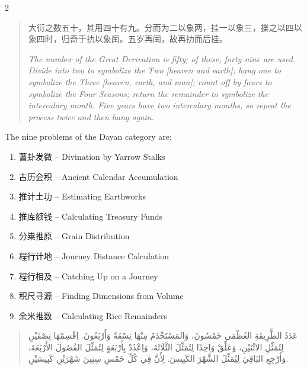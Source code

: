 \documentclass[11pt,a4paper]{article}
\newcommand{\ar}[1]{\arabicfont\beginR #1\endR}
\newcommand{\zhtext}[1]{{\chinese #1}}
\newenvironment{bilingual}{%
  \begin{paracol}{2}
}{%
  \end{paracol}
}
\begin{document}
\vspace{0.5em}

\begin{bilingual}
\begin{leftcolumn*}
\begin{quote}
\zhtext{大衍之数五十，其用四十有九。分而为二以象两，挂一以象三，揲之以四以象四时，归奇于扐以象闰。五岁再闰，故再扐而后挂。}

\textit{The number of the Great Derivation is fifty; of these, forty-nine are used. Divide into two to symbolize the Two [heaven and earth]; hang one to symbolize the Three [heaven, earth, and man]; count off by fours to symbolize the Four Seasons; return the remainder to symbolize the intercalary month. Five years have two intercalary months, so repeat the process twice and then hang again.}
\end{quote}

The nine problems of the Dayan category are:
\begin{enumerate}[label=\arabic*.]
  \item \zhtext{蓍卦发微} -- Divination by Yarrow Stalks
  \item \zhtext{古历会积} -- Ancient Calendar Accumulation
  \item \zhtext{推计土功} -- Estimating Earthworks
  \item \zhtext{推库额钱} -- Calculating Treasury Funds
  \item \zhtext{分粜推原} -- Grain Distribution
  \item \zhtext{程行计地} -- Journey Distance Calculation
  \item \zhtext{程行相及} -- Catching Up on a Journey
  \item \zhtext{积尺寻源} -- Finding Dimensions from Volume
  \item \zhtext{余米推数} -- Calculating Rice Remainders
\end{enumerate}
\end{leftcolumn*}

\begin{rightcolumn*}
\begin{quote}
\ar{عَدَدُ الطَّرِيقَةِ العُظْمَى خَمْسُونَ، وَالمَسْتَخْدَمُ مِنْهَا تِسْعَةٌ وَأَرْبَعُونَ. اِقْسِمْهَا نِصْفَيْنِ لِتُمَثِّلِ الاثْنَيْنِ، وَعَلِّقْ وَاحِدًا لِتُمَثِّلَ الثَّلَاثَةَ، وَاِعْدُدْ بِأَرْبَعَةٍ لِتُمَثِّلَ الفُصُولَ الأَرْبَعَةَ، وَأَرْجِعِ البَاقِيَ لِيُمَثِّلَ الشَّهْرَ الكَبِيسَ. لِأَنَّ فِي كُلِّ خَمْسِ سِنِينَ شَهْرَيْنِ كَبِيسَيْنِ.}
\end{quote}


\end{rightcolumn*}
\end{bilingual}
\end{document}
